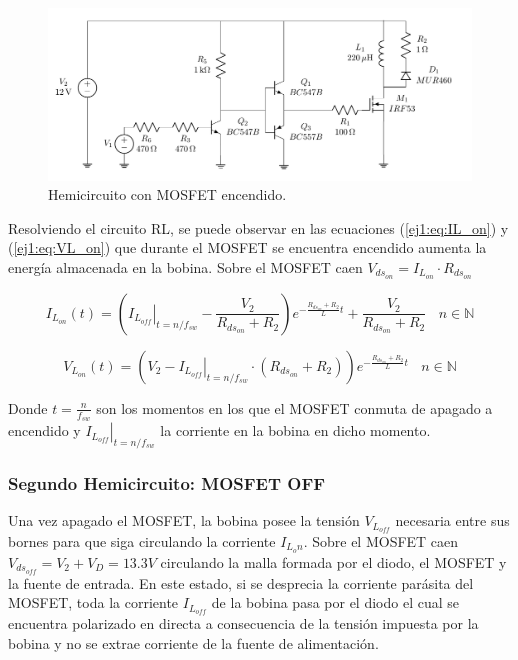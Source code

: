 \begin{figure}[H]
	\centering
	\includegraphics[width=0.4\linewidth, page=3]{ImagenesEjercicio-1/CircuitsEj1}
	\caption{Hemicircuito con MOSFET encendido.}
	\label{ej1:fig:circuito_on}
\end{figure}

Resolviendo el circuito RL, se puede observar en las ecuaciones (\ref{ej1:eq:IL_on}) y (\ref{ej1:eq:VL_on}) que durante el MOSFET se encuentra encendido aumenta la energía almacenada en la bobina. Sobre el MOSFET caen $V_{ds_{on}} = I_{L_{on}}\cdot R_{ds_{on}}$

\begin{equation}
	 I_{L_{on}}(t) = \left( \left. I_{L_{off}} \right|_{t= n/f_{sw}} -\frac{V_2}{R_{ds_{on}}+R_2}\right) e^{-\frac{R_{ds_{on}}+R_2}{L}t} + \frac{V_2}{R_{ds_{on}}+R_2} \ \ \ \ n \in \mathbb{N}
\label{ej1:eq:IL_on}
\end{equation}

\begin{equation}
	V_{L_{on}}(t) = \left( V_2 - \left. I_{L_{off}} \right|_{t= n/f_{sw}}\cdot (R_{ds_{on}}+R_2) \right)e^{-\frac{R_{ds_{on}}+R_2}{L}t} \ \ \ \ n \in \mathbb{N}
\label{ej1:eq:VL_on}
\end{equation}

Donde $t=\frac{n}{f_{sw}}$ son los momentos en los que el MOSFET conmuta de apagado a encendido y $\left. I_{L_{off}} \right|_{t= n/f_{sw}}$ la corriente en la bobina en dicho momento.

\subsubsection{Segundo Hemicircuito: MOSFET OFF}

Una vez apagado el MOSFET, la bobina posee la tensión $V_{L_{off}}$ necesaria entre sus bornes para que siga circulando la corriente $I_{L_on}$. Sobre el MOSFET caen $V_{ds_{off}} = V_2 + V_D = 13.3V$ circulando la malla formada por el diodo, el MOSFET y la fuente de entrada. En este estado, si se desprecia la corriente parásita del MOSFET, toda la corriente $I_{L_{off}}$ de la bobina pasa por el diodo el cual se encuentra polarizado en directa a consecuencia de la tensión impuesta por la bobina y no se extrae corriente de la fuente de alimentación.


